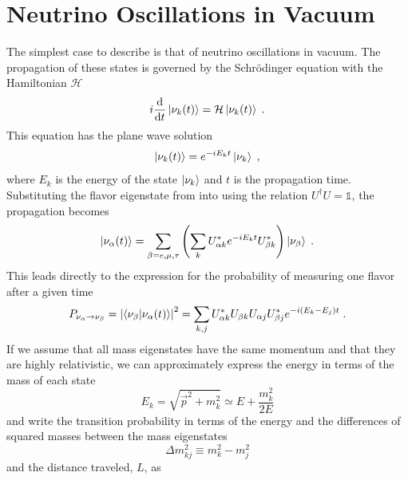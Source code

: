 \section{Neutrino Oscillations in Vacuum}
The simplest case to describe is that of neutrino oscillations in vacuum.
The propagation of these states is governed by the Schrödinger equation with the Hamiltonian $\mathcal{H}$
\begin{equation}
    i \dv{t} \ket{\nu_k(t)} = \mathcal{H} \ket{\nu_k(t)}\;.
\end{equation}
This equation has the plane wave solution
\begin{equation}
    \ket{\nu_k(t)} = e^{-iE_k t} \ket{\nu_k}\;,\label{eq:schrodinger-eq}
\end{equation}
where $E_k$ is the energy of the state $\ket{\nu_k}$ and $t$ is the propagation time.
Substituting the flavor eigenstate from  into  using the relation $U^\dag U=\mathbb{1}$, the propagation becomes
\begin{equation}
    \ket{\nu_\alpha(t)} = \sum_{\beta=e,\mu,\tau} \left(\sum_k U^*_{\alpha k} e^{-iE_k t}  U^*_{\beta k}\right) \ket{\nu_\beta}\;.\label{eq:flav-evolution}
\end{equation}
This leads directly to the expression for the probability of measuring one flavor after a given time
\begin{equation}
    P_{\nu_\alpha \rightarrow \nu_\beta} = \abs{\braket{\nu_\beta}{\nu_\alpha(t)}}^2
    = \sum_{k,j}U^*_{\alpha k}U_{\beta k}U_{\alpha j}U_{\beta j}^* e^{-i(E_k - E_j)t}\;.
\end{equation}
If we assume that all mass eigenstates have the same momentum and that they are highly relativistic, we can approximately express the energy in terms of the mass of each state
\begin{equation}
    E_k = \sqrt{\vec{p}^2 + m_k^2} \simeq E + \frac{m_k^2}{2E}
\end{equation}
and write the transition probability in terms of the energy and the differences of squared masses between the mass eigenstates
\begin{equation}
    \Delta m_{kj}^2 \equiv m_k^2 - m_j^2
\end{equation}
and the distance traveled, $L$, as
